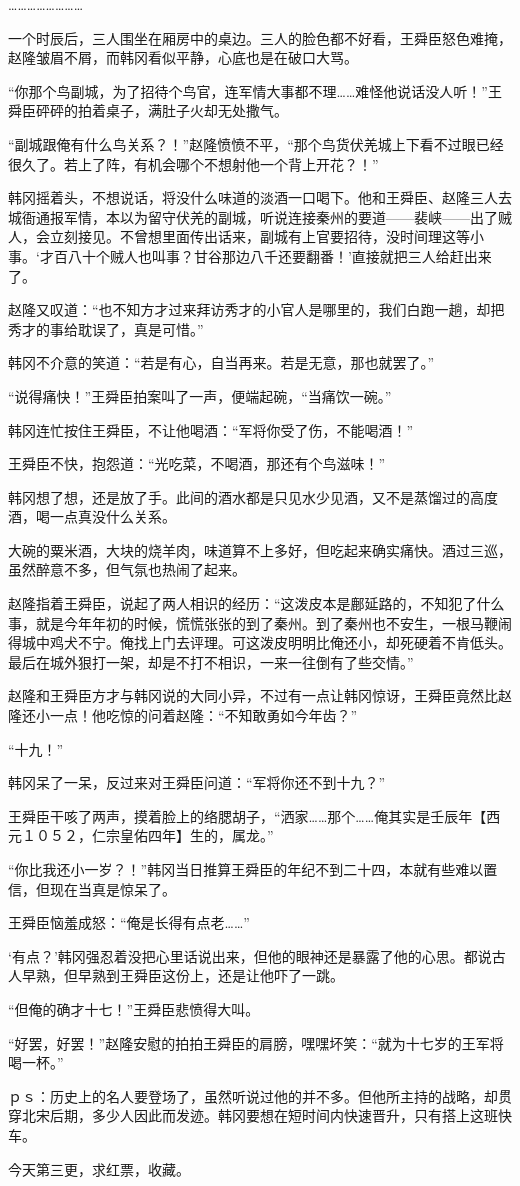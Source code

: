 ……………………

一个时辰后，三人围坐在厢房中的桌边。三人的脸色都不好看，王舜臣怒色难掩，赵隆皱眉不屑，而韩冈看似平静，心底也是在破口大骂。

“你那个鸟副城，为了招待个鸟官，连军情大事都不理……难怪他说话没人听！”王舜臣砰砰的拍着桌子，满肚子火却无处撒气。

“副城跟俺有什么鸟关系？！”赵隆愤愤不平，“那个鸟货伏羌城上下看不过眼已经很久了。若上了阵，有机会哪个不想射他一个背上开花？！”

韩冈摇着头，不想说话，将没什么味道的淡酒一口喝下。他和王舜臣、赵隆三人去城衙通报军情，本以为留守伏羌的副城，听说连接秦州的要道——裴峡——出了贼人，会立刻接见。不曾想里面传出话来，副城有上官要招待，没时间理这等小事。‘才百八十个贼人也叫事？甘谷那边八千还要翻番！’直接就把三人给赶出来了。

赵隆又叹道：“也不知方才过来拜访秀才的小官人是哪里的，我们白跑一趟，却把秀才的事给耽误了，真是可惜。”

韩冈不介意的笑道：“若是有心，自当再来。若是无意，那也就罢了。”

“说得痛快！”王舜臣拍案叫了一声，便端起碗，“当痛饮一碗。”

韩冈连忙按住王舜臣，不让他喝酒：“军将你受了伤，不能喝酒！”

王舜臣不快，抱怨道：“光吃菜，不喝酒，那还有个鸟滋味！”

韩冈想了想，还是放了手。此间的酒水都是只见水少见酒，又不是蒸馏过的高度酒，喝一点真没什么关系。

大碗的粟米酒，大块的烧羊肉，味道算不上多好，但吃起来确实痛快。酒过三巡，虽然醉意不多，但气氛也热闹了起来。

赵隆指着王舜臣，说起了两人相识的经历：“这泼皮本是鄜延路的，不知犯了什么事，就是今年年初的时候，慌慌张张的到了秦州。到了秦州也不安生，一根马鞭闹得城中鸡犬不宁。俺找上门去评理。可这泼皮明明比俺还小，却死硬着不肯低头。最后在城外狠打一架，却是不打不相识，一来一往倒有了些交情。”

赵隆和王舜臣方才与韩冈说的大同小异，不过有一点让韩冈惊讶，王舜臣竟然比赵隆还小一点！他吃惊的问着赵隆：“不知敢勇如今年齿？”

“十九！”

韩冈呆了一呆，反过来对王舜臣问道：“军将你还不到十九？”

王舜臣干咳了两声，摸着脸上的络腮胡子，“洒家……那个……俺其实是壬辰年【西元１０５２，仁宗皇佑四年】生的，属龙。”

“你比我还小一岁？！”韩冈当日推算王舜臣的年纪不到二十四，本就有些难以置信，但现在当真是惊呆了。

王舜臣恼羞成怒：“俺是长得有点老……”

‘有点？’韩冈强忍着没把心里话说出来，但他的眼神还是暴露了他的心思。都说古人早熟，但早熟到王舜臣这份上，还是让他吓了一跳。

“但俺的确才十七！”王舜臣悲愤得大叫。

“好罢，好罢！”赵隆安慰的拍拍王舜臣的肩膀，嘿嘿坏笑：“就为十七岁的王军将喝一杯。”

ｐｓ：历史上的名人要登场了，虽然听说过他的并不多。但他所主持的战略，却贯穿北宋后期，多少人因此而发迹。韩冈要想在短时间内快速晋升，只有搭上这班快车。

今天第三更，求红票，收藏。


